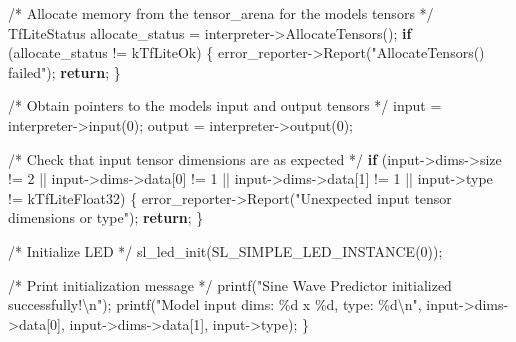\documentclass[
  9pt,
  letterpaper,
  abstract,
  titlepage]{scrbook}
\newenvironment{Shaded}{\begin{snugshade}}{\end{snugshade}}
\newcommand{\CommentTok}[1]{\textcolor[rgb]{0.37,0.37,0.37}{#1}}
\newcommand{\ControlFlowTok}[1]{\textcolor[rgb]{0.00,0.23,0.31}{\textbf{#1}}}
\newcommand{\DecValTok}[1]{\textcolor[rgb]{0.68,0.00,0.00}{#1}}
\newcommand{\NormalTok}[1]{\textcolor[rgb]{0.00,0.23,0.31}{#1}}
\newcommand{\OperatorTok}[1]{\textcolor[rgb]{0.37,0.37,0.37}{#1}}
\newcommand{\SpecialCharTok}[1]{\textcolor[rgb]{0.37,0.37,0.37}{#1}}
\newcommand{\StringTok}[1]{\textcolor[rgb]{0.13,0.47,0.30}{#1}}
\begin{document}
\begin{Shaded}
\begin{Highlighting}[]
  \CommentTok{/* Allocate memory from the tensor\_arena for the model\textquotesingle{}s tensors */}
\NormalTok{  TfLiteStatus allocate\_status }\OperatorTok{=}\NormalTok{ interpreter}\OperatorTok{{-}\textgreater{}}\NormalTok{AllocateTensors}\OperatorTok{();}
  \ControlFlowTok{if} \OperatorTok{(}\NormalTok{allocate\_status }\OperatorTok{!=}\NormalTok{ kTfLiteOk}\OperatorTok{)} \OperatorTok{\{}
\NormalTok{    error\_reporter}\OperatorTok{{-}\textgreater{}}\NormalTok{Report}\OperatorTok{(}\StringTok{"AllocateTensors() failed"}\OperatorTok{);}
    \ControlFlowTok{return}\OperatorTok{;}
  \OperatorTok{\}}

  \CommentTok{/* Obtain pointers to the model\textquotesingle{}s input and output tensors */}
\NormalTok{  input }\OperatorTok{=}\NormalTok{ interpreter}\OperatorTok{{-}\textgreater{}}\NormalTok{input}\OperatorTok{(}\DecValTok{0}\OperatorTok{);}
\NormalTok{  output }\OperatorTok{=}\NormalTok{ interpreter}\OperatorTok{{-}\textgreater{}}\NormalTok{output}\OperatorTok{(}\DecValTok{0}\OperatorTok{);}

  \CommentTok{/* Check that input tensor dimensions are as expected */}
  \ControlFlowTok{if} \OperatorTok{(}\NormalTok{input}\OperatorTok{{-}\textgreater{}}\NormalTok{dims}\OperatorTok{{-}\textgreater{}}\NormalTok{size }\OperatorTok{!=} \DecValTok{2} \OperatorTok{||}\NormalTok{ input}\OperatorTok{{-}\textgreater{}}\NormalTok{dims}\OperatorTok{{-}\textgreater{}}\NormalTok{data}\OperatorTok{[}\DecValTok{0}\OperatorTok{]} \OperatorTok{!=} \DecValTok{1} \OperatorTok{||} 
\NormalTok{      input}\OperatorTok{{-}\textgreater{}}\NormalTok{dims}\OperatorTok{{-}\textgreater{}}\NormalTok{data}\OperatorTok{[}\DecValTok{1}\OperatorTok{]} \OperatorTok{!=} \DecValTok{1} \OperatorTok{||}\NormalTok{ input}\OperatorTok{{-}\textgreater{}}\NormalTok{type }\OperatorTok{!=}\NormalTok{ kTfLiteFloat32}\OperatorTok{)} \OperatorTok{\{}
\NormalTok{    error\_reporter}\OperatorTok{{-}\textgreater{}}\NormalTok{Report}\OperatorTok{(}\StringTok{"Unexpected input tensor dimensions or type"}\OperatorTok{);}
    \ControlFlowTok{return}\OperatorTok{;}
  \OperatorTok{\}}

  \CommentTok{/* Initialize LED */}
\NormalTok{  sl\_led\_init}\OperatorTok{(}\NormalTok{SL\_SIMPLE\_LED\_INSTANCE}\OperatorTok{(}\DecValTok{0}\OperatorTok{));}
  
  \CommentTok{/* Print initialization message */}
\NormalTok{  printf}\OperatorTok{(}\StringTok{"Sine Wave Predictor initialized successfully!}\SpecialCharTok{\textbackslash{}n}\StringTok{"}\OperatorTok{);}
\NormalTok{  printf}\OperatorTok{(}\StringTok{"Model input dims: }\SpecialCharTok{\%d}\StringTok{ x }\SpecialCharTok{\%d}\StringTok{, type: }\SpecialCharTok{\%d\textbackslash{}n}\StringTok{"}\OperatorTok{,} 
\NormalTok{         input}\OperatorTok{{-}\textgreater{}}\NormalTok{dims}\OperatorTok{{-}\textgreater{}}\NormalTok{data}\OperatorTok{[}\DecValTok{0}\OperatorTok{],}\NormalTok{ input}\OperatorTok{{-}\textgreater{}}\NormalTok{dims}\OperatorTok{{-}\textgreater{}}\NormalTok{data}\OperatorTok{[}\DecValTok{1}\OperatorTok{],}\NormalTok{ input}\OperatorTok{{-}\textgreater{}}\NormalTok{type}\OperatorTok{);}
\OperatorTok{\}}


\end{Highlighting}
\end{Shaded}
\end{document}
